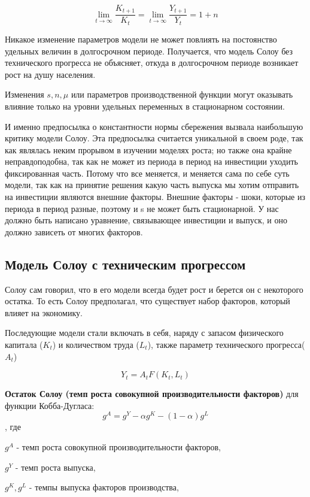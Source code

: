\documentclass[reqno]{article}
\theoremstyle{definition}
\theoremstyle{definition}
\theoremstyle{definition}
\theoremstyle{definition}
\theoremstyle{definition}
\theoremstyle{definition}
\theoremstyle{definition}
\theoremstyle{definition}
\theoremstyle{definition}
\begin{document}
		$$\lim_{t \rightarrow \infty} \frac{K_{t+1}}{K_t} = \lim_{t \rightarrow \infty} \frac{Y_{t+1}}{Y_t} = 1 + n$$
		
		Никакое изменение параметров модели не может повлиять на постоянство удельных величин в долгосрочном периоде. Получается, что модель Солоу без технического прогресса не объясняет, откуда в долгосрочном периоде возникает рост на душу населения.
		
		Изменения $s,n,\mu$ или параметров производственной функции могут оказывать влияние только на уровни удельных переменных в стационарном состоянии.
		
		И именно предпосылка о константности нормы сбережения вызвала наибольшую критику модели Солоу. Эта предпосылка считается уникальной в своем роде, так как являлась неким прорывом в изучении моделях роста; но также она крайне неправдоподобна, так как не может из периода в период на инвестиции уходить фиксированная часть. Потому что все меняется, и меняется сама по себе суть модели, так как на принятие решения какую часть выпуска мы хотим отправить на инвестиции являются внешние факторы. Внешние факторы - шоки, которые из периода в период разные, поэтому и s не может быть стационарной. У нас должно быть написано уравнение, связывающее инвестиции и выпуск, и оно должно зависеть от многих факторов.
		
		\subsection{Модель Солоу с техническим прогрессом}
		
		Солоу сам говорил, что в его модели всегда будет рост и берется он с некоторого остатка. То есть Солоу предполагал, что существует набор факторов, который влияет на экономику.
		
		Последующие модели стали включать в себя, наряду с запасом физического капитала ($K_t$) и количеством труда ($L_t$), также параметр технического прогресса($A_t$)
		
		$$Y_t = A_t F(K_t,L_t)$$
		
		\textbf{Остаток Солоу (темп роста совокупной производительности факторов)} для функции Кобба-Дугласа:
		$$g^A = g^Y - \alpha g^K - (1 - \alpha) g^L$$
		, где
		
		$g^A$ - темп роста совокупной производительности факторов,
		
		$g^Y$ - темп роста выпуска,
		
		$g^K, g^L$ - темпы выпуска факторов производства,
		
\end{document}
